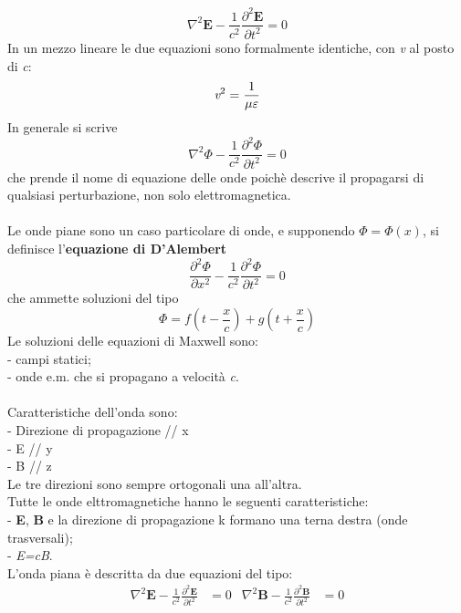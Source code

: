 \documentclass{article}
\begin{document}
\begin{equation}
\nabla^2\textbf{E}-\frac{1}{c^2}\frac{\partial^2\textbf{E}}{\partial t^2}=0    
\nonumber
\end{equation}
In un mezzo lineare le due equazioni sono formalmente identiche, con \emph{v} al posto di \emph{c}:
\begin{equation}
    \emph{v}^2=\frac{1}{\mu\varepsilon}
    \nonumber
\end{equation}
In generale si scrive
\begin{equation}
\nabla^2\Phi-\frac{1}{c^2}\frac{\partial^2\Phi}{\partial t^2}=0 
\nonumber
\end{equation}
che prende il nome di equazione delle onde poichè descrive il propagarsi di qualsiasi perturbazione, non solo elettromagnetica.\\ \\
Le onde piane sono un caso particolare di onde, e supponendo $\Phi=\Phi(x)$, si definisce l'\textbf{equazione di D'Alembert}
\begin{equation}
\frac{\partial^2\Phi}{\partial x^2}-\frac{1}{c^2}\frac{\partial^2\Phi}{\partial t^2}=0 
\nonumber
\end{equation}
che ammette soluzioni del tipo
\begin{equation}
   \Phi=f\left(t-\frac{x}{c}\right)+g\left(t+\frac{x}{c}\right)
\nonumber 
\end{equation}
Le soluzioni delle equazioni di Maxwell sono: \\
- campi statici;\\
- onde e.m. che si propagano a velocità \emph{c}.
\\\\
Caratteristiche dell’onda sono:\\
- Direzione di propagazione // x \\
- E // y\\
- B // z\\
Le tre direzioni sono sempre ortogonali una all’altra.\\
Tutte le onde elttromagnetiche hanno le seguenti caratteristiche:\\
- \textbf{E}, \textbf{B} e la direzione di propagazione k formano una terna
destra (onde trasversali);\\ 
- \emph{E=cB}.\\
L'onda piana è descritta da due equazioni del tipo:
\begin{align*}
\nabla^2\textbf{E}-\frac{1}{c^2}\frac{\partial^2\textbf{E}}{\partial t^2}&=0 & \nabla^2\textbf{B}-\frac{1}{c^2}\frac{\partial^2\textbf{B}}{\partial t^2}&=0   
\nonumber
\end{align*}
\end{document}
